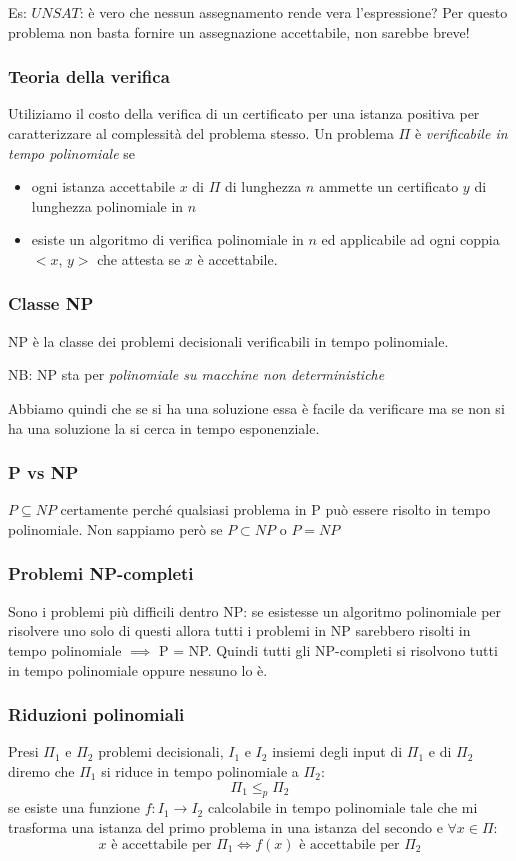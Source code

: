 Es: $UNSAT$: è vero che nessun assegnamento rende vera l'espressione? Per questo problema non basta fornire un assegnazione accettabile, non sarebbe breve!

\subsubsection{Teoria della verifica}
Utiliziamo il costo della verifica di un certificato per una istanza positiva per caratterizzare al complessità del problema stesso. Un problema $\Pi$ è \emph{verificabile in tempo polinomiale} se 
\begin{itemize}
    \item ogni istanza accettabile $x$ di $\Pi$ di lunghezza $n$ ammette un certificato $y$ di lunghezza polinomiale in $n$
    \item esiste un algoritmo di verifica polinomiale in $n$ ed applicabile ad ogni coppia $<x$, $y>$ che attesta se $x$ è accettabile.
\end{itemize}


\subsubsection{Classe NP}
NP è la classe dei problemi decisionali verificabili in tempo polinomiale.

NB: NP sta per \emph{polinomiale su macchine non deterministiche}

Abbiamo quindi che se si ha una soluzione essa è facile da verificare ma se non si ha una soluzione la si cerca in tempo esponenziale.

\subsubsection{P vs NP}
$P \subseteq NP$ certamente perché qualsiasi problema in P può essere risolto in tempo polinomiale. Non sappiamo però se $P \subset NP$ o $P = NP$


\subsubsection{Problemi NP-completi}
Sono i problemi più difficili dentro NP: se esistesse un algoritmo polinomiale per risolvere uno solo di questi allora tutti i problemi in NP sarebbero risolti in tempo polinomiale $\implies$ P = NP. Quindi tutti gli NP-completi si risolvono tutti in tempo polinomiale oppure nessuno lo è.

\subsubsection{Riduzioni polinomiali}
Presi $\Pi_{1}$ e $\Pi_{2}$ problemi decisionali, $I_{1}$ e $I_{2}$ insiemi degli input di $\Pi_{1}$ e di $\Pi_{2}$ diremo che $\Pi_{1}$ si riduce in tempo polinomiale a $\Pi_{2}$:
$$ \Pi_{1} \leq_{p} \Pi_{2} $$
se esiste una funzione $f:I_{1} \longrightarrow I_{2}$ calcolabile in tempo polinomiale tale che mi trasforma una istanza del primo problema in una istanza del secondo e $\forall x \in \Pi$:
$$ x \text{ è accettabile per } \Pi_{1} \Longleftrightarrow f(x) \text{ è accettabile per } \Pi_{2} $$

